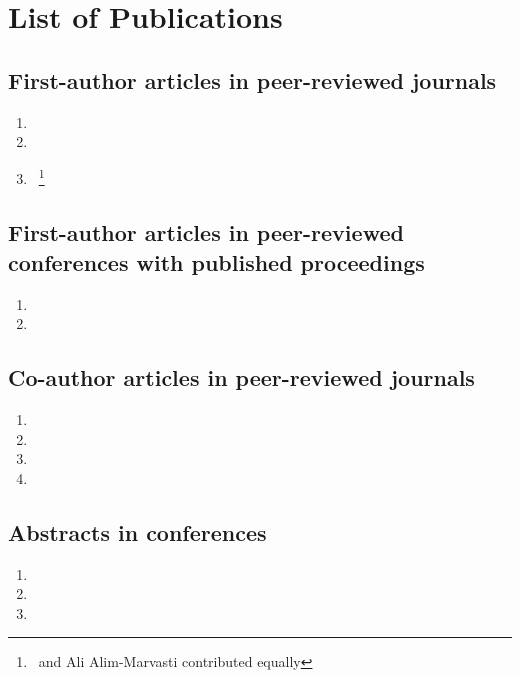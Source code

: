 \chapter{List of Publications}

\section*{First-author articles in peer-reviewed journals} %
\label{sec:first_author_journal_articles}
\begin{enumerate}
  \item {}
  \item {}
  \item {}~\footnote{\theauthor\ and Ali Alim-Marvasti contributed equally}
\end{enumerate}

\section*{First-author articles in peer-reviewed conferences with published proceedings}
\label{sec:first_author_peer_reviewed_conference_papers}
\begin{enumerate}
  \item {\sloppy {}}
  \item {}
\end{enumerate}

\section*{Co-author articles in peer-reviewed journals} %
\label{sec:journal_articles}
\begin{enumerate}
  \item {}
  \item {}
  \item {}
  \item {}
\end{enumerate}

\section*{Abstracts in conferences} %
\label{sec:abstracts}
\begin{enumerate}
  \item {}
  \item {}
  \item {}
\end{enumerate}
